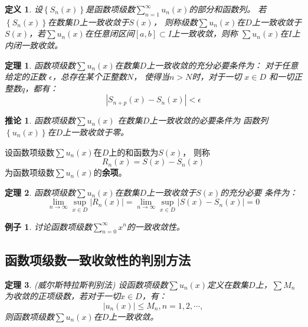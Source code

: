 \documentclass[a4paper,12pt]{article}
\newtheorem{theorem}{定理}
\newtheorem{definition}{定义}
\newtheorem{example}{例子}
\newtheorem{corollary}{推论}
\begin{document}
\begin{definition}
    设$\left\{S_n(x)\right\}$是函数项级数$\displaystyle \sum_{n=1}^{\infty}u_n(x)$的部分和函数列。
    若$\left\{S_n(x)\right\}$在数集$D$上一致收敛于$S(x)$， 则称级数$\sum u_n(x)$在$D$上一致收敛于
    $S(x)$，若$\displaystyle \sum u_n(x)$在任意闭区间$[a,b] \subset I$上一致收敛，则称
    $\displaystyle \sum u_n(x)$在$I$上内闭一致收敛。
\end{definition}
\begin{theorem}
    函数项级数$\displaystyle \sum u_n(x)$在数集$D$上一致收敛的充分必要条件为：
    对于任意给定的正数 $\epsilon$，总存在某个正整数$N$， 使得当$n > N$时，对于一切
    $x \in D$ 和一切正整数$q$，都有：
    \[
        \left|S_{n+p}(x) - S_n(x)\right| < \epsilon
        \]
\end{theorem}

\begin{corollary}
    函数项级数$\displaystyle \sum u_n(x)$ 在数集$D$上一致收敛的必要条件为
    函数列$\displaystyle \left\{u_n(x)\right\}$在$D$上一致收敛于零。
\end{corollary}

设函数项级数$\displaystyle \sum u_n(x)$在$D$上的和函数为$S(x)$， 则称
\[
    R_n(x) = S(x) - S_n(x)
    \]
为函数项级数$\displaystyle \sum u_n(x)$的\textbf{余项}。

\begin{theorem}
    函数项级数$\displaystyle \sum u_n(x)$在数集$D$上一致收敛于$S(x)$的充分必要
    条件为：
    \[
        \lim_{n \to \infty}\sup_{x \in D} \left|R_n(x)\right| = 
        \lim_{n \to \infty}\sup_{x \in D} \left|S(x) - S_n(x)\right| = 0
        \]
\end{theorem}

\begin{example}
    讨论函数项级数$\displaystyle \sum_{n=0}^{\infty}x^n$的一致收敛性。
\end{example}

\subsection{函数项级数一致收敛性的判别方法}
\begin{theorem}{\rm (威尔斯特拉斯判别法)}
    设函数项级数$\displaystyle \sum u_n(x)$定义在数集$D$上，$\displaystyle \sum M_n$
    为收敛的正项级数，若对于一切$x \in D$，有：
    \begin{equation}
        \left|u_n(x)\right| \le M_n, n = 1, 2, \cdots,
        \label{eq:eq7}
    \end{equation}
    则函数项级数$\displaystyle \sum u_n(x)$在$D$上一致收敛。
\end{theorem}
\end{document}
